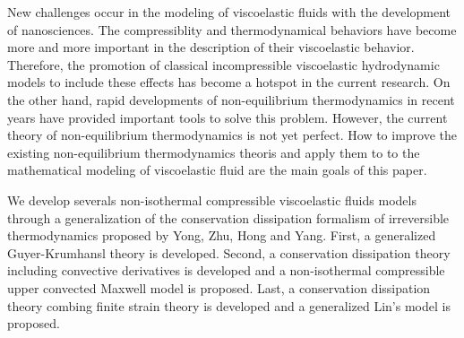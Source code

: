 \begin{eabstract}
  \noindent New challenges occur in the modeling of viscoelastic fluids with the development of nanosciences. The compressiblity and thermodynamical behaviors have become more and more important in the description of their viscoelastic behavior. Therefore, the promotion of classical incompressible viscoelastic hydrodynamic models to include these effects has become a hotspot in the current research. On the other hand, rapid developments of non-equilibrium thermodynamics in recent years have provided important tools to solve this problem. However, the current theory of non-equilibrium thermodynamics is not yet perfect. How to improve the existing non-equilibrium thermodynamics theoris and apply them to to the mathematical modeling of viscoelastic fluid are the main goals of this paper.

  
 We develop severals non-isothermal compressible viscoelastic fluids models through a generalization of the conservation dissipation formalism of irreversible thermodynamics proposed by Yong, Zhu, Hong and Yang. First, a generalized Guyer-Krumhansl theory is developed. Second, a conservation dissipation theory including convective derivatives is developed and a non-isothermal compressible upper convected Maxwell model is proposed. Last, a conservation dissipation theory combing finite strain theory is developed and a generalized Lin's model is proposed.



\end{eabstract}
